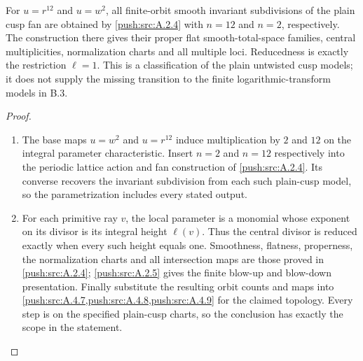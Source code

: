 \begin{corollary}\label{push:src:B.2.3}\label{push:B23}

For $u=r^{12}$ and $u=w^2$, all finite-orbit smooth invariant
subdivisions of the plain cusp fan are obtained by \ref{push:src:A.2.4}
with $n=12$ and $n=2$, respectively. The construction there
gives their proper flat smooth-total-space families,
central multiplicities, normalization charts and all
multiple loci. Reducedness is exactly the restriction
$\ell=1$. This is a classification of the plain untwisted
cusp models; it does not supply the missing transition to
the finite logarithmic-transform models in B.3.
\end{corollary}

\begin{proof}
\begin{enumerate}[label=\arabic*.,leftmargin=*]
\item The base maps $u=w^2$ and $u=r^{12}$ induce multiplication by
$2$ and $12$ on the integral parameter characteristic. Insert
$n=2$ and $n=12$ respectively into the periodic lattice action
and fan construction of \ref{push:src:A.2.4}. Its converse
recovers the invariant subdivision from each such plain-cusp
model, so the parametrization includes every stated output.

\item For each primitive ray $v$, the local parameter is a monomial
whose exponent on its divisor is its integral height $\ell(v)$.
Thus the central divisor is reduced exactly when every such
height equals one. Smoothness, flatness, properness, the
normalization charts and all intersection maps are those proved
in \ref{push:src:A.2.4}; \ref{push:src:A.2.5} gives the finite
blow-up and blow-down presentation. Finally substitute the
resulting orbit counts and maps into
\ref{push:src:A.4.7,push:src:A.4.8,push:src:A.4.9} for the
claimed topology. Every step is on the specified plain-cusp
charts, so the conclusion has exactly the scope in the statement.
\end{enumerate}
\end{proof}


